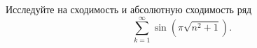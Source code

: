 \documentclass{article}
\begin{document}
Исследуйте на сходимость и абсолютную сходимость ряд
$$\sum\limits_{k=1}^\infty \sin \left( \pi \sqrt{n^2 + 1} \right).$$
\end{document}
